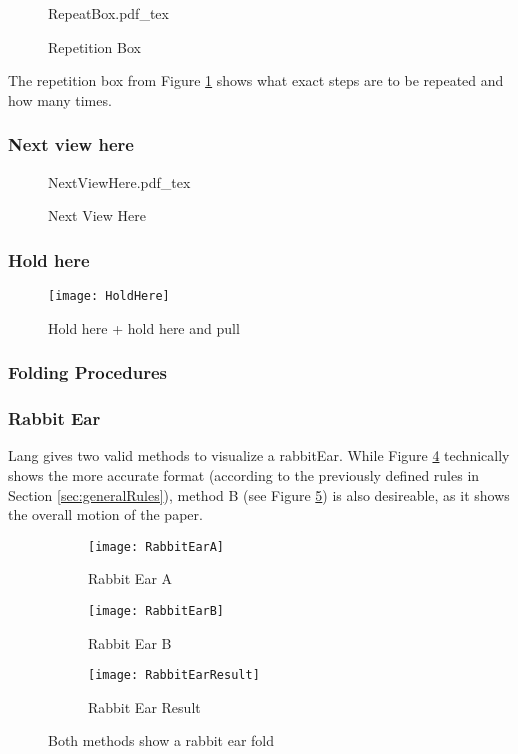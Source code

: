 \begin{figure}[htbp]
	\centering
	\def\svgwidth{0.3\textwidth}
	{RepeatBox.pdf_tex}
	\caption{Repetition Box}
	\label{fig:repeatBox}
\end{figure}
\noindent The repetition box from Figure \ref{fig:repeatBox} shows what exact steps are to be repeated and how many times.

\subsubsection*{Next view here}
\begin{figure}[htbp]
	\centering
	\def\svgwidth{0.6\textwidth}
	{NextViewHere.pdf_tex}
	\caption{Next View Here}
	\label{fig:nextViewHere}
\end{figure}

\subsubsection*{Hold here}
\begin{figure}[htbp]
	\centering
	\texttt{[image: HoldHere]}
	\caption{Hold here + hold here and pull}
	\label{fig:holdHere}
\end{figure}

\newpage
\subsubsection{Folding Procedures}
\subsubsection*{Rabbit Ear}
Lang gives two valid methods to visualize a \gls{rabbitEar}. While Figure \ref{fig:rabbitEarA} technically shows the more accurate format (according to the previously defined rules in Section \ref{sec:generalRules}), method B (see Figure \ref{fig:rabbitEarB}) is also desireable, as it shows the overall motion of the paper.
\begin{figure*}[htbp]
    \centering
    \begin{subfigure}{0.27\textwidth}
        \texttt{[image: RabbitEarA]}
        \caption{Rabbit Ear A}
        \label{fig:rabbitEarA}
    \end{subfigure}
    \begin{subfigure}{0.35\textwidth}
        \texttt{[image: RabbitEarB]}
        \caption{Rabbit Ear B}
        \label{fig:rabbitEarB}
    \end{subfigure}
    \begin{subfigure}{0.33\textwidth}
	\texttt{[image: RabbitEarResult]}
	\caption{Rabbit Ear Result}
	\label{fig:rabbitEarResult}
    \end{subfigure}
    \caption{Both methods show a rabbit ear fold}
    \label{fig:rabbitEarMethods}
\end{figure*}

